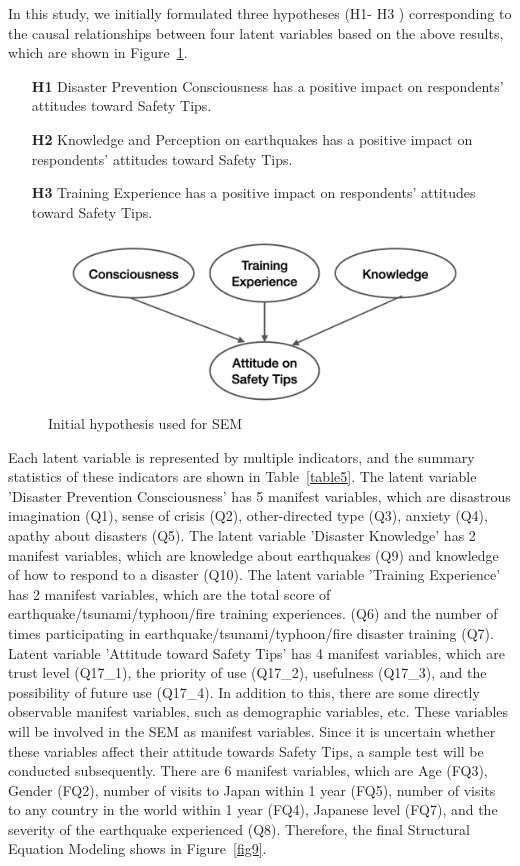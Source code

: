 In this study, we initially formulated three hypotheses (H1- H3 ) corresponding to the causal relationships between four latent variables based on the above results, which are shown in Figure~\ref{fig30}.

\begin{itemize}
\item[\textbf{H1}] Disaster Prevention Consciousness has a positive impact on respondents' attitudes toward Safety Tips.
\item[\textbf{H2}] Knowledge and Perception on earthquakes has a positive impact on respondents' attitudes toward Safety Tips.
\item[\textbf{H3}] Training Experience has a positive impact on respondents' attitudes toward Safety Tips.
\end{itemize}

\begin{figure}[h]
  \includegraphics[width=0.5\linewidth]{Figure/Figure30.jpg}
  \centering
  \caption{Initial hypothesis used for SEM}
  \label{fig30}
\end{figure}

Each latent variable is represented by multiple indicators, and the summary statistics of these indicators are shown in Table~\ref{table5}. The latent variable 'Disaster Prevention Consciousness' has 5 manifest variables, which are disastrous imagination (Q1), sense of crisis (Q2), other-directed type (Q3), anxiety (Q4), apathy about disasters (Q5). The latent variable 'Disaster Knowledge' has 2 manifest variables, which are knowledge about earthquakes (Q9) and knowledge of how to respond to a disaster (Q10). The latent variable 'Training Experience' has 2 manifest variables, which are the total score of earthquake/tsunami/typhoon/fire training experiences. (Q6) and the number of times participating in earthquake/tsunami/typhoon/fire disaster training (Q7). Latent variable 'Attitude toward Safety Tips' has 4 manifest variables, which are trust level (Q17\_1), the priority of use (Q17\_2), usefulness (Q17\_3), and the possibility of future use (Q17\_4). In addition to this, there are some directly observable manifest variables, such as demographic variables, etc. These variables will be involved in the SEM as manifest variables. Since it is uncertain whether these variables affect their attitude towards Safety Tips, a sample test will be conducted subsequently. There are 6 manifest variables, which are Age (FQ3), Gender (FQ2), number of visits to Japan within 1 year (FQ5), number of visits to any country in the world within 1 year (FQ4), Japanese level (FQ7), and the severity of the earthquake experienced (Q8). Therefore, the final Structural Equation Modeling shows in Figure~\ref{fig9}.

